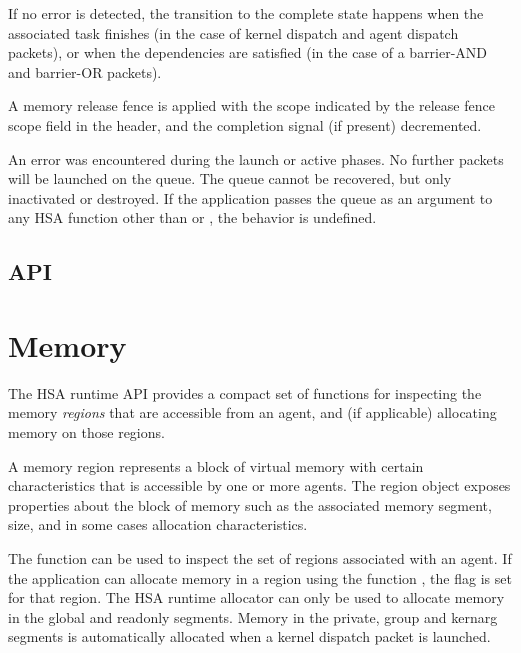 \documentclass[oneside]{book}
\begin{document}
\begin{description}[itemsep=2pt,leftmargin=0cm, labelindent=0cm]
  If no error is detected, the transition to the complete state happens when the
  associated task finishes (in the case of kernel dispatch and agent dispatch
  packets), or when the dependencies are satisfied (in the case of a barrier-AND
  and barrier-OR packets).

\item[Complete] A memory release fence is applied with the scope indicated by
  the release fence scope field in the header, and the completion signal (if
  present) decremented.

\item[Error] An error was encountered during the launch or active phases. No
  further packets will be launched on the queue. The queue cannot be recovered,
  but only inactivated or destroyed. If the application passes the queue as an
  argument to any HSA function other than  or
  , the behavior is undefined.

\end{description}


\subsection{API}


\section{Memory}\label{sec:memory}

The HSA runtime API provides a compact set of functions for inspecting the
memory \emph{regions} that are accessible from an agent, and (if applicable)
allocating memory on those regions.

A memory region represents a block of virtual memory with certain
characteristics that is accessible by one or more agents. The region object
 exposes properties about the block of memory such as the
associated memory segment, size, and in some cases allocation characteristics.

The function  can be used to inspect the set
of regions associated with an agent.  If the application can allocate memory
in a region using the function , the flag
 is set for that region. The HSA
runtime allocator can only be used to allocate memory in the global and readonly
segments. Memory in the private, group and kernarg segments is automatically
allocated when a kernel dispatch packet is launched.
\end{document}
